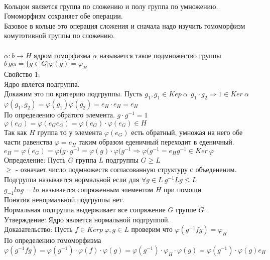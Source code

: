 \\

Кольцои является группа по сложению и полу группа по умножению.\\
Гомоморфизм сохраняет обе операции.\\
Базовое в кольце это операция сложения и сначала надо изучить гомоморфизм
комутотивной группы по сложению.\\


\\

$\alpha : b \to H$ ядром гоморфизма $\alpha$ называется такое подмножество
группы $b ~ g\alpha = \{g \in G| \varphi (g) = \varphi_H$\\
Свойство 1:\\
Ядро явлется подгруппа.\\
Докажим это по критерию подгруппы. Пусть $g_1,g_1 \in Kep~\alpha
~~ g_1 \cdot g_2 \Rightarrow 1 \in Ker~\alpha$ $\varphi(g_1,g_2) =
\varphi (g_1)\varphi (g_2) = e_H \cdot e_H = e_H$\\
По определению обратого элемента. $g\cdot g^{-1} = 1$\\
$\varphi(e_G) = \varphi(e_G e_G) = \varphi(e_G) \cdot \varphi(e_G) \in H$\\
Так как $H$ группа то у элемента $\varphi(e_G)$ есть обратный, умножая на него
обе части равенства $\varphi = e_H$ таким образом еденичный переходит в
еденичный.\\
$e_H = \varphi(e_G) = \varphi(g\cdot g^{-1} = \varphi(g)\cdot \varphi(g^{-1}
\Rightarrow \varphi(g^{-1} = e_H g^{-1} \in Ker~\varphi$\\

Определение: Пусть $G$ группа $L$ подгруппы $G \ge L$\\
$\ge$ - означает число подмножеств согласованную структуру с объедененим.\\
Подгруппа называется нормальной если для $\forall g \in L ~ g^{-1} Lg \le L$\\
$g_{-1} lng = ln$ называется сопряженным элементом $H$ при помощи\\
Понятия ненормальной подгруппы нет.\\
Нормальная подгруппа выдерживает все сопряжение $G$ группе $G$.\\

Утверждение: Ядро является нормальной подгруппой.\\
Доказательство: Пусть $f \in Kerp~\varphi, g\in L$ проверим что $\varphi(g^{-1}
fg) = \varphi_H$\\
По определению гомоморфизма $\varphi(g^{-1} fg) = \varphi(g^{-1}) \cdot
\varphi(f) \cdot \varphi(g) = \varphi(g^{-1}) \cdot \varphi_H \cdot \varphi(g) =
\varphi(g^{-1}) \cdot \varphi(g) e_H$\\

